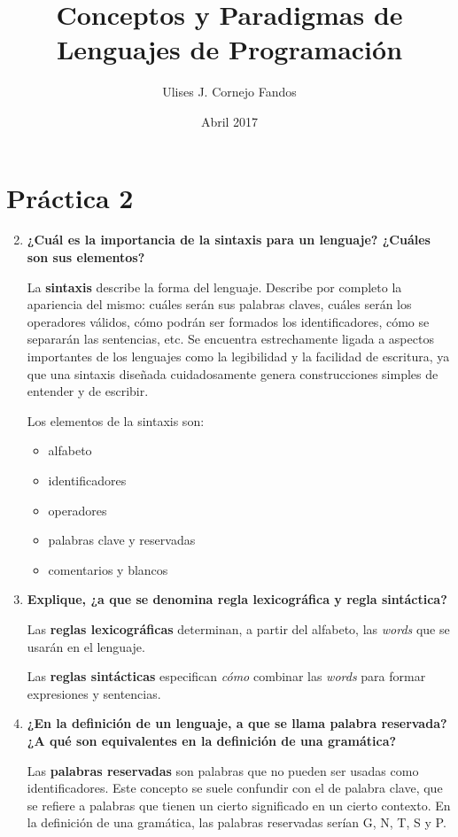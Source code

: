 \documentclass[a4paper,10pt]{article}
\title{Conceptos y Paradigmas de Lenguajes de Programación}
\author{Ulises J. Cornejo Fandos}
\date{Abril 2017}
\begin{document}
\maketitle

\section{Práctica 2}
    
    \begin{enumerate}
        \setcounter{enumi}{1}
        \item \textbf{¿Cuál es la importancia de la sintaxis para un lenguaje? ¿Cuáles son sus elementos?}
        
        La \textbf{sintaxis} describe la forma del lenguaje. Describe por completo la apariencia del mismo: cuáles serán sus palabras claves, cuáles serán los operadores válidos, cómo podrán ser formados los identificadores, cómo se separarán las sentencias, etc. Se encuentra estrechamente ligada a aspectos importantes de los lenguajes como la legibilidad y la facilidad de escritura, ya que una sintaxis diseñada cuidadosamente genera construcciones simples de entender y de escribir.     
        
        Los elementos de la sintaxis son:
        \begin{itemize}
            \item alfabeto
            \item identificadores
            \item operadores
            \item palabras clave y reservadas
            \item comentarios y blancos
        \end{itemize}
        
        \item \textbf{Explique, ¿a que se denomina regla lexicográfica y regla sintáctica?}
        
            Las \textbf{reglas lexicográficas} determinan, a partir del alfabeto, las \textit{words} que se usarán en el lenguaje.
    
            Las \textbf{reglas sintácticas} especifican \textit{cómo} combinar las \textit{words} para formar expresiones y sentencias.
            
        \item \textbf{¿En la definición de un lenguaje, a que se llama palabra reservada? ¿A qué son equivalentes en la definición de una gramática?}
        
            Las \textbf{palabras reservadas} son palabras que no pueden ser usadas como identificadores. Este concepto se suele confundir con el de palabra clave, que se refiere a palabras que tienen un cierto significado en un cierto contexto. En la definición de una gramática, las palabras reservadas serían G, N, T, S y P.       
        
    \end{enumerate}
\end{document}
